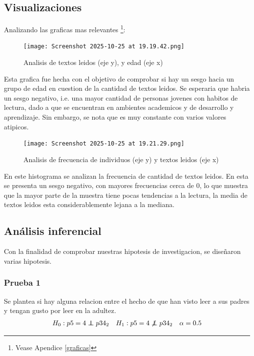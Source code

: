\documentclass[aps,reprint]{revtex4-2}
\begin{document}
\subsection{Visualizaciones}

Analizando las graficas mas relevantes \footnote{Vease Apendice \ref{graficas}}:

\begin{figure}[H]
  \centering
  \texttt{[image: Screenshot 2025-10-25 at 19.19.42.png]}
  \caption{Analisis de textos leidos (eje y), y edad (eje x)}
\end{figure}

Esta grafica fue hecha con el objetivo de comprobar si hay un sesgo hacia un grupo de edad en cuestion de la cantidad de textos leidos. Se esperaria que habria un sesgo negativo, i.e. una mayor cantidad de personas jovenes con habitos de lectura, dado a que se encuentran en ambientes academicos y de desarrollo y aprendizaje. Sin embargo, se nota que es muy constante con varios valores atipicos.

\begin{figure}[H]
  \centering
  \texttt{[image: Screenshot 2025-10-25 at 19.21.29.png]}
  \caption{Analisis de frecuencia de individuos (eje y) y textos leidos (eje x)}
\end{figure}

En este histograma se analizan la frecuencia de cantidad de textos leidos. En esta se presenta un sesgo negativo, con mayores frecuencias cerca de 0, lo que muestra que la mayor parte de la muestra tiene pocas tendencias a la lectura, la media de textos leidos esta considerablemente lejana a la mediana.

\subsection{Análisis inferencial}

Con la finalidad de comprobar nuestras hipotesis de investigacion, se diseñaron varias hipotesis.

\subsubsection{Prueba 1}

Se plantea si hay alguna relacion entre el hecho de que han visto leer a sus padres y tengan gusto por leer en la adultez.
\newcommand\independent{\protect\mathpalette{\protect\independenT}{\perp}}
\def\independenT#1#2{\mathrel{\rlap{$#1#2$}\mkern2mu{#1#2}}}
\begin{align}
  H_0: p5=4\independent p34_2\quad H_1:p5=4\not\independent p34_2\quad \alpha=0.5
\end{align}
\end{document}
